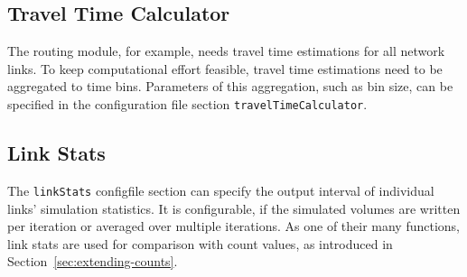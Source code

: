 \subsection{Travel Time Calculator}
\label{sec:ttc}
The routing module, for example, needs travel time estimations for all network links. To keep  computational effort feasible, travel time estimations need to be aggregated to time bins. Parameters of this aggregation, such as bin size, can be specified in the configuration file section \lstinline|travelTimeCalculator|.

\subsection{Link Stats}
\label{sec:linkStats}
The \lstinline|linkStats| \gls{configfile} section can specify the output interval of individual links' simulation statistics. It is configurable, if the simulated volumes are written per iteration or averaged over multiple iterations. As one of their many functions, link stats are used for comparison with count values, as introduced in Section~\ref{sec:extending-counts}. 


